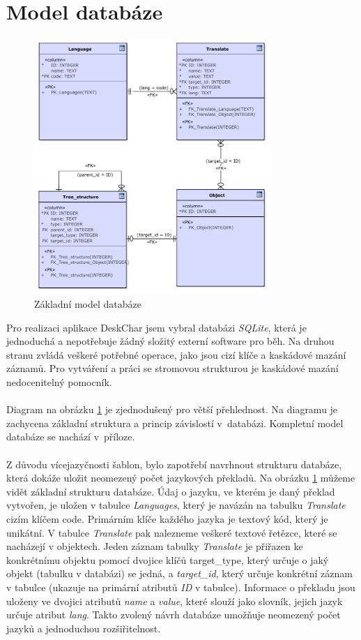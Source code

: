 \documentclass[thesis=B,czech]{resources/FITthesis}[2012/06/26]
\begin{document}
	\section{Model databáze}
	\begin{figure}\centering
	\includegraphics[width=0.8\textwidth]{images/basic_database}
	\caption[Základní model databáze]{Základní model databáze}\label{fig:db_basic}
	\end{figure}
	Pro realizaci aplikace DeskChar jsem vybral databázi \textit{SQLite}, která je jednoduchá a nepotřebuje žádný složitý externí software pro běh. Na druhou stranu zvládá veškeré potřebné operace, jako jsou cizí klíče a kaskádové mazání záznamů. Pro vytváření a práci se stromovou strukturou je kaskádové mazání nedocenitelný pomocník. \\
\\
Diagram na obrázku \ref{fig:db_basic} je zjednodušený pro větší přehlednost. Na diagramu je zachycena základní struktura a princip závislostí v~databázi. Kompletní model databáze se nachází v~příloze.\\
\\
Z důvodu vícejazyčnosti šablon, bylo zapotřebí navrhnout strukturu databáze, která dokáže uložit neomezený počet jazykových překladů. Na obrázku \ref{fig:db_basic} můžeme vidět základní strukturu databáze. Údaj o jazyku, ve kterém je daný překlad vytvořen, je uložen v tabulce \textit{Languages}, který je navázán na tabulku \textit{Translate} cizím klíčem code. Primárním klíče každého jazyka je textový kód, který je unikátní. V tabulce \textit{Translate} pak nalezneme veškeré textové řetězce, které se nacházejí v objektech. Jeden záznam tabulky \textit{Translate} je přiřazen ke konkrétnímu objektu pomocí dvojice klíčů target\_type, který určuje o jaký objekt (tabulku v databázi) se jedná, a \textit{target\_id}, který určuje konkrétní záznam v tabulce (ukazuje na primární atributů \textit{ID} v tabulce). Informace o překladu jsou uloženy ve dvojici atributů \textit{name} a \textit{value}, které slouží jako slovník, jejich jazyk určuje atribut \textit{lang}. Takto zvolený návrh databáze umožňuje neomezený počet jazyků a jednoduchou rozšiřitelnost.\\
\end{document}
